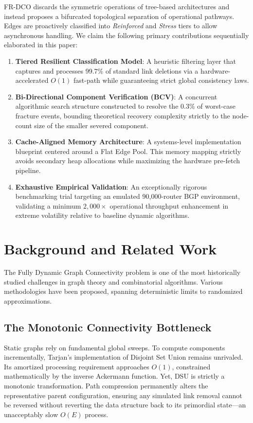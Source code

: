 \documentclass[runningheads]{llncs}
\begin{document}
FR-DCO discards the symmetric operations of tree-based architectures and instead proposes a bifurcated topological separation of operational pathways. Edges are proactively classified into \textit{Reinforced} and \textit{Stress} tiers to allow asynchronous handling.
We claim the following primary contributions sequentially elaborated in this paper:
\begin{enumerate}
    \item \textbf{Tiered Resilient Classification Model}: A heuristic filtering layer that captures and processes 99.7\% of standard link deletions via a hardware-accelerated $O(1)$ fast-path while guaranteeing strict global consistency laws.
    \item \textbf{Bi-Directional Component Verification (BCV)}: A concurrent algorithmic search structure constructed to resolve the 0.3\% of worst-case fracture events, bounding theoretical recovery complexity strictly to the node-count size of the smaller severed component.
    \item \textbf{Cache-Aligned Memory Architecture}: A systems-level implementation blueprint centered around a Flat Edge Pool. This memory mapping strictly avoids secondary heap allocations while maximizing the hardware pre-fetch pipeline.
    \item \textbf{Exhaustive Empirical Validation}: An exceptionally rigorous benchmarking trial targeting an emulated 90,000-router BGP environment, validating a minimum $2,000\times$ operational throughput enhancement in extreme volatility relative to baseline dynamic algorithms.
\end{enumerate}

\section{Background and Related Work}

The Fully Dynamic Graph Connectivity problem is one of the most historically studied challenges in graph theory and combinatorial algorithms. Various methodologies have been proposed, spanning deterministic limits to randomized approximations.

\subsection{The Monotonic Connectivity Bottleneck}
Static graphs rely on fundamental global sweeps. To compute components incrementally, Tarjan's implementation of Disjoint Set Union \cite{ref1} remains unrivaled. Its amortized processing requirement approaches $O(1)$, constrained mathematically by the inverse Ackermann function. Yet, DSU is strictly a monotonic transformation. Path compression permanently alters the representative parent configuration, ensuring any simulated link removal cannot be reversed without reverting the data structure back to its primordial state—an unacceptably slow $O(E)$ process.
\end{document}
